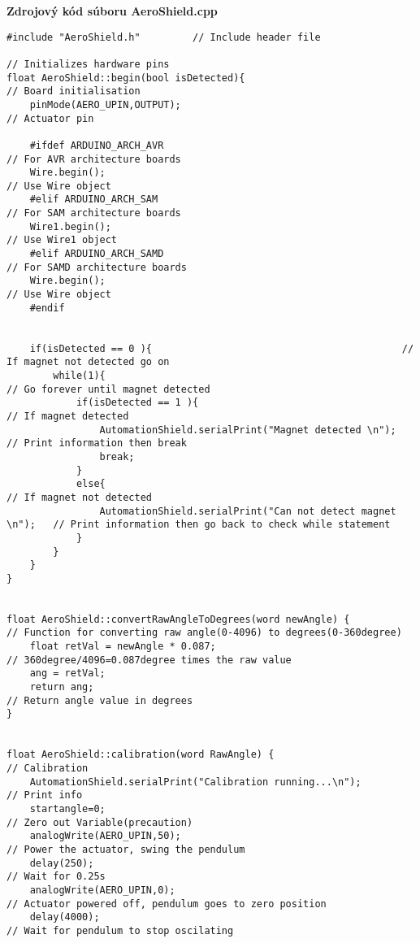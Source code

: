 \LARGE\bf{Zdrojový kód súboru AeroShield.cpp}
\vspace{1cm}
\begin{lstlisting}[caption={Zdrojový kód súboru AeroShield.cpp.},captionpos=b]	
#include "AeroShield.h"         // Include header file

// Initializes hardware pins
float AeroShield::begin(bool isDetected){                             // Board initialisation
	pinMode(AERO_UPIN,OUTPUT);  		                                  // Actuator pin
	
	#ifdef ARDUINO_ARCH_AVR                                             // For AVR architecture boards
	Wire.begin();                                                     // Use Wire object
	#elif ARDUINO_ARCH_SAM                                              // For SAM architecture boards
	Wire1.begin();                                                    // Use Wire1 object
	#elif ARDUINO_ARCH_SAMD                                             // For SAMD architecture boards
	Wire.begin();                                                     // Use Wire object
	#endif
	
	
	if(isDetected == 0 ){                                           // If magnet not detected go on
		while(1){                                                           // Go forever until magnet detected 
			if(isDetected == 1 ){                                           // If magnet detected
				AutomationShield.serialPrint("Magnet detected \n");         // Print information then break
				break;
			}
			else{                                                           // If magnet not detected 
				AutomationShield.serialPrint("Can not detect magnet \n");   // Print information then go back to check while statement
			}
		}
	}       
} 


float AeroShield::convertRawAngleToDegrees(word newAngle) {             // Function for converting raw angle(0-4096) to degrees(0-360degree) 
	float retVal = newAngle * 0.087;                                      // 360degree/4096=0.087degree times the raw value
	ang = retVal;                               
	return ang;                                                           // Return angle value in degrees 
}


float AeroShield::calibration(word RawAngle) {                          // Calibration 
	AutomationShield.serialPrint("Calibration running...\n");             // Print info 
	startangle=0;                                                         // Zero out Variable(precaution)
	analogWrite(AERO_UPIN,50);                                            // Power the actuator, swing the pendulum 
	delay(250);                                                           // Wait for 0.25s 
	analogWrite(AERO_UPIN,0);                                             // Actuator powered off, pendulum goes to zero position
	delay(4000);                                                          // Wait for pendulum to stop oscilating 
	

\end{lstlisting}
